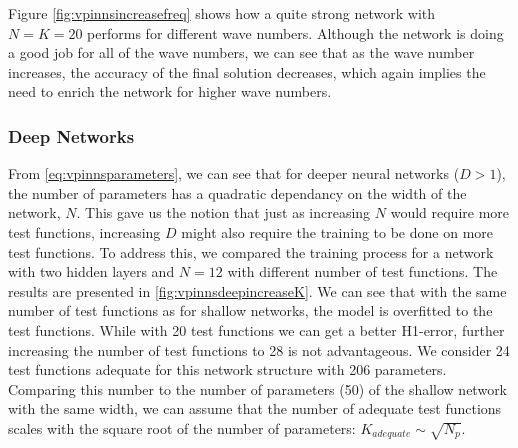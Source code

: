 Figure \ref{fig:vpinnsincreasefreq} shows how a quite strong network with $N=K=20$ performs for different wave numbers. Although the network is doing a good job for all of the wave numbers, we can see that as the wave number increases, the accuracy of the final solution decreases, which again implies the need to enrich the network for higher wave numbers.

\subsubsection{Deep Networks}\label{sec:deepnetworks}
From \autoref{eq:vpinnsparameters}, we can see that for deeper neural networks ($D>1$), the number of parameters has a quadratic dependancy on the width of the network, $N$. This gave us the notion that just as increasing $N$ would require more test functions, increasing $D$ might also require the training to be done on more test functions. To address this, we compared the training process for a network with two hidden layers and $N=12$ with different number of test functions. The results are presented in \autoref{fig:vpinnsdeepincreaseK}. We can see that with the same number of test functions as for shallow networks, the model is overfitted to the test functions. While with 20 test functions we can get a better H1-error, further increasing the number of test functions to 28 is not advantageous. We consider 24 test functions adequate for this network structure with 206 parameters. Comparing this number to the number of parameters (50) of the shallow network with the same width, we can assume that the number of adequate test functions scales with the square root of the number of parameters: $K_{adequate} \sim \sqrt{N_p}$.

